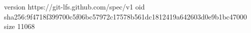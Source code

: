 version https://git-lfs.github.com/spec/v1
oid sha256:9f4718f399700c5f06bc57972c17578b561dc1812419a642603d0e9b1bc47000
size 11068
